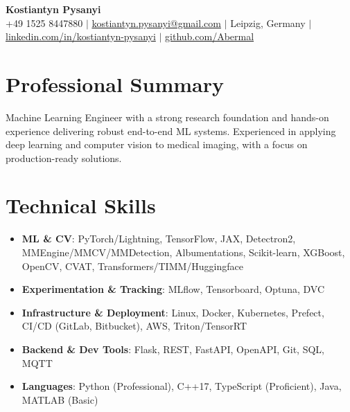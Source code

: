 \documentclass[letterpaper,10pt]{article}
\newcommand{\resumeItem}[1]{
    \item\small{#1}\vspace{-0.5pt}
}
\newcommand{\resumeSubHeadingList}{\begin{itemize}[leftmargin=0.15in, label={}]\vspace{-2pt}}
\newcommand{\resumeSubHeadingListEnd}{\end{itemize}}
\begin{document}
\begin{center}
  \textbf{\Huge Kostiantyn Pysanyi}\vspace{4pt} \\
  \small +49 1525 8447880 $|$ \href{mailto:kostiantyn.pysanyi@gmail.com}{kostiantyn.pysanyi@gmail.com} $|$ Leipzig, Germany $|$
  \href{https://www.linkedin.com/in/kostiantyn-pysanyi/}{linkedin.com/in/kostiantyn-pysanyi} $|$ \href{https://github.com/Abermal}{github.com/Abermal}
\end{center}

\section{Professional Summary}
Machine Learning Engineer with a strong research foundation and hands-on experience delivering robust end-to-end ML systems. Experienced in applying deep learning and computer vision to medical imaging, with a focus on production-ready solutions.

\section{Technical Skills}
\resumeSubHeadingList
  \resumeItem{\textbf{ML \& CV}: PyTorch/Lightning, TensorFlow, JAX, Detectron2, MMEngine/MMCV/MMDetection, Albumentations, Scikit-learn, XGBoost, OpenCV, CVAT, Transformers/TIMM/Huggingface}
  \resumeItem{\textbf{Experimentation \& Tracking}: MLflow, Tensorboard, Optuna, DVC}
  \resumeItem{\textbf{Infrastructure \& Deployment}: Linux, Docker, Kubernetes, Prefect, CI/CD (GitLab, Bitbucket), AWS, Triton/TensorRT}
  \resumeItem{\textbf{Backend \& Dev Tools}: Flask, REST, FastAPI, OpenAPI, Git, SQL, MQTT}
  \resumeItem{\textbf{Languages}: Python (Professional), C++17, TypeScript (Proficient), Java, MATLAB (Basic)}
\resumeSubHeadingListEnd
\end{document}

